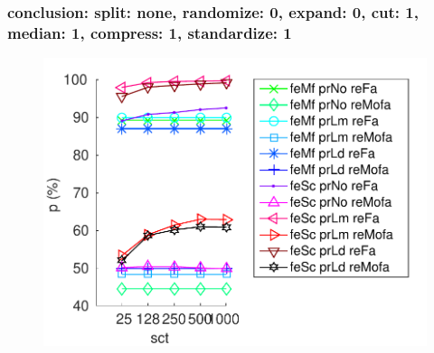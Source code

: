 \documentclass{beamer}
\begin{document}
\begin{frame}\frametitle{\small conclusion: split: none, randomize: 0, expand: 0, cut: 1, median: 1, compress: 1, standardize: 1}
\begin{center}
\begin{figure}
\centering
\includegraphics[width=\textwidth,height=0.8\textheight,keepaspectratio]{./figures/Fig149.pdf}
\label{spnoRa0Ex0Cu1Me1Co1St1}
\end{figure}
\end{center}


\end{frame}
\end{document}
